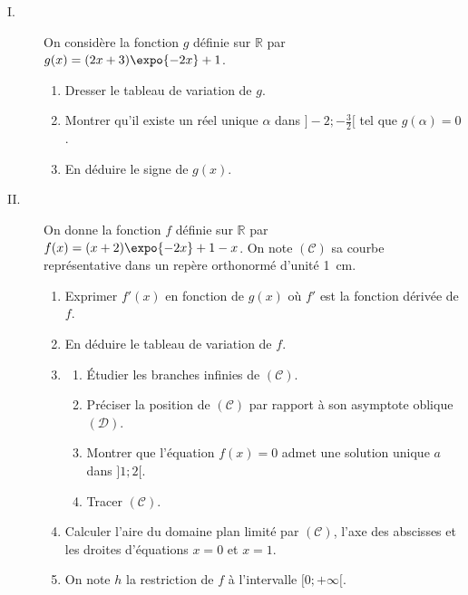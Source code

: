 \begin{exo}
\label{exo:pb deux x plus trois}
      \begin{description}
            \item[I.] On consid\`ere la fonction $g$ d\'efinie sur $\mathbb{R}$ par $g(x) = (2 x + 3) \expo{-2x} + 1$.
                  \begin{enumerate}
                        \item Dresser le tableau de variation de $g$.
                        \item Montrer qu'il existe un r\'eel unique $\alpha$ dans $] -2 ; - \frac{3}{2} [$
                              tel que $g(\alpha) = 0$.
                        \item En d\'eduire le signe de $g(x)$.
                  \end{enumerate}
            \item[II.] On donne la fonction $f$ d\'efinie sur $\mathbb{R}$ par $f(x) = (x+2) \expo{-2x} + 1 - x$.
                       On note $(\mathscr{C})$ sa courbe repr\'esentative dans un rep\`ere orthonorm\'e d'unit\'e 1~cm.
                  \begin{enumerate}
                        \item Exprimer $f'(x)$ en fonction de $g(x)$ o\`u $f'$ est la fonction d\'eriv\'ee de $f$.
                        \item En d\'eduire le tableau de variation de $f$.
                        \item \begin{enumerate}
                                    \item \'Etudier les branches infinies de $(\mathscr{C})$.
                                    \item Pr\'eciser la position de $(\mathscr{C})$ par rapport \`a son asymptote oblique $(\mathscr{D})$.
                                    \item Montrer que l'\'equation $f(x) = 0$ admet une solution unique $a$ dans $]1 ; 2[$.
                                    \item Tracer $(\mathscr{C})$.
                              \end{enumerate}
                        \item Calculer l'aire du domaine plan limit\'e par $(\mathscr{C})$,
                              l'axe des abscisses et les droites d'\'equations $x=0$ et $x=1$.
                        \item On note $h$ la restriction de $f$ \`a l'intervalle $[0 ; +\infty[$.

\end{enumerate}
\end{description}
\end{exo}
